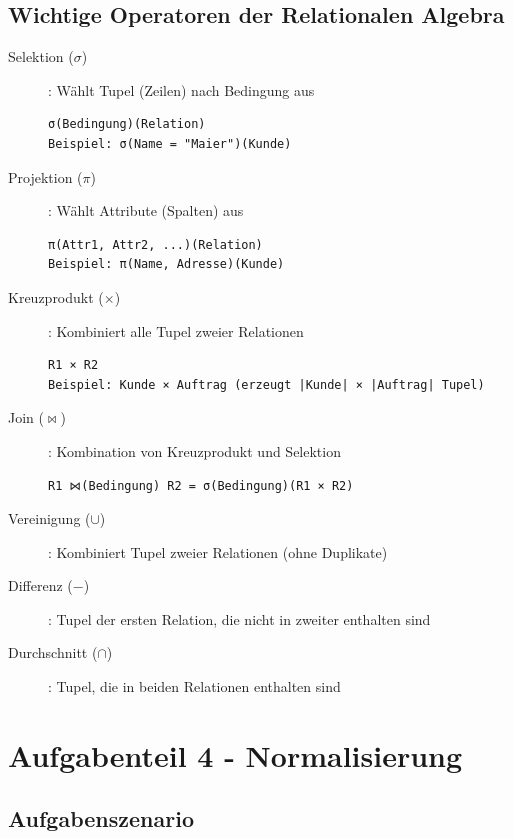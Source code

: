 \documentclass[a4paper]{article}
\begin{document}
\subsection{Wichtige Operatoren der Relationalen Algebra}

\begin{description}
    \item[Selektion ($\sigma$)]: Wählt Tupel (Zeilen) nach Bedingung aus
    \begin{lstlisting}
σ(Bedingung)(Relation)
Beispiel: σ(Name = "Maier")(Kunde)
    \end{lstlisting}
    
    \item[Projektion ($\pi$)]: Wählt Attribute (Spalten) aus
    \begin{lstlisting}
π(Attr1, Attr2, ...)(Relation)
Beispiel: π(Name, Adresse)(Kunde)
    \end{lstlisting}
    
    \item[Kreuzprodukt ($\times$)]: Kombiniert alle Tupel zweier Relationen
    \begin{lstlisting}
R1 × R2
Beispiel: Kunde × Auftrag (erzeugt |Kunde| × |Auftrag| Tupel)
    \end{lstlisting}
    
    \item[Join ($\bowtie$)]: Kombination von Kreuzprodukt und Selektion
    \begin{lstlisting}
R1 ⋈(Bedingung) R2 = σ(Bedingung)(R1 × R2)
    \end{lstlisting}
    
    \item[Vereinigung ($\cup$)]: Kombiniert Tupel zweier Relationen (ohne Duplikate)
    \item[Differenz ($-$)]: Tupel der ersten Relation, die nicht in zweiter enthalten sind
    \item[Durchschnitt ($\cap$)]: Tupel, die in beiden Relationen enthalten sind
\end{description}

\newpage

\section{Aufgabenteil 4 - Normalisierung}

\subsection{Aufgabenszenario}
\end{document}
